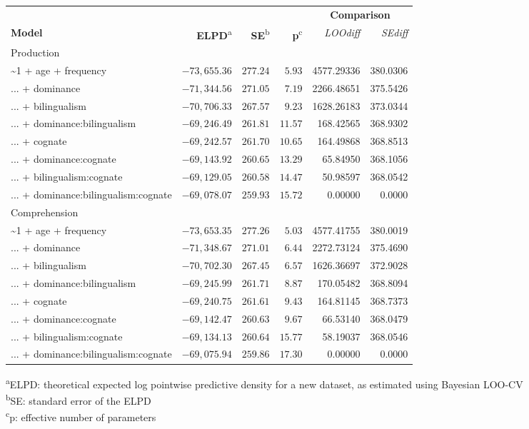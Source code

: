 \documentclass[
  english,
  man,man,floatsintext]{apa6}
\begin{document}
\captionsetup[table]{labelformat=empty,skip=1pt}
\begin{longtable}{lrrrrr}
\toprule
& & & & \multicolumn{2}{c}{\textbf{Comparison}} \\ 
 \cmidrule(lr){5-6}
\textbf{Model} & \textbf{ELPD}\textsuperscript{a} & \textbf{SE}\textsuperscript{b} & \textbf{p}\textsuperscript{c} & \emph{LOOdiff} & \emph{SEdiff} \\ 
\midrule
\multicolumn{1}{l}{Production} \\ 
\midrule
\textasciitilde  1 + age + frequency & $-73,655.36$ & $277.24$ & $5.93$ & 4577.29336 & 380.0306 \\ 
... + dominance & $-71,344.56$ & $271.05$ & $7.19$ & 2266.48651 & 375.5426 \\ 
... + bilingualism & $-70,706.33$ & $267.57$ & $9.23$ & 1628.26183 & 373.0344 \\ 
... + dominance:bilingualism & $-69,246.49$ & $261.81$ & $11.57$ & 168.42565 & 368.9302 \\ 
... + cognate & $-69,242.57$ & $261.70$ & $10.65$ & 164.49868 & 368.8513 \\ 
... + dominance:cognate & $-69,143.92$ & $260.65$ & $13.29$ & 65.84950 & 368.1056 \\ 
... + bilingualism:cognate & $-69,129.05$ & $260.58$ & $14.47$ & 50.98597 & 368.0542 \\ 
... + dominance:bilingualism:cognate & $-69,078.07$ & $259.93$ & $15.72$ & 0.00000 & 0.0000 \\ 
\midrule
\multicolumn{1}{l}{Comprehension} \\ 
\midrule
\textasciitilde  1 + age + frequency & $-73,653.35$ & $277.26$ & $5.03$ & 4577.41755 & 380.0019 \\ 
... + dominance & $-71,348.67$ & $271.01$ & $6.44$ & 2272.73124 & 375.4690 \\ 
... + bilingualism & $-70,702.30$ & $267.45$ & $6.57$ & 1626.36697 & 372.9028 \\ 
... + dominance:bilingualism & $-69,245.99$ & $261.71$ & $8.87$ & 170.05482 & 368.8094 \\ 
... + cognate & $-69,240.75$ & $261.61$ & $9.43$ & 164.81145 & 368.7373 \\ 
... + dominance:cognate & $-69,142.47$ & $260.63$ & $9.67$ & 66.53140 & 368.0479 \\ 
... + bilingualism:cognate & $-69,134.13$ & $260.64$ & $15.77$ & 58.19037 & 368.0546 \\ 
... + dominance:bilingualism:cognate & $-69,075.94$ & $259.86$ & $17.30$ & 0.00000 & 0.0000 \\ 
\bottomrule
\end{longtable}
\vspace{-5mm}
\begin{minipage}{\linewidth}
\textsuperscript{a}ELPD: theoretical expected log pointwise predictive density for a new dataset, as estimated using Bayesian LOO-CV \\ 
\textsuperscript{b}SE: standard error of the ELPD \\ 
\textsuperscript{c}p: effective number of parameters \\ 
\end{minipage}
\end{document}
